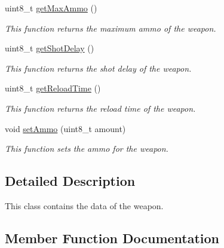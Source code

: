 \begin{DoxyCompactItemize}
\mbox{\label{class_weapon_a32fb116e169af265f52b4f51e955f44f}} 
uint8\+\_\+t \mbox{\hyperlink{class_weapon_a32fb116e169af265f52b4f51e955f44f}{get\+Max\+Ammo}} ()
\begin{DoxyCompactList}\small\item\em This function returns the maximum ammo of the weapon. \end{DoxyCompactList}\item 
\mbox{\label{class_weapon_aee03c3f7faeb4ac9e29dd72a1821d7fe}} 
uint8\+\_\+t \mbox{\hyperlink{class_weapon_aee03c3f7faeb4ac9e29dd72a1821d7fe}{get\+Shot\+Delay}} ()
\begin{DoxyCompactList}\small\item\em This function returns the shot delay of the weapon. \end{DoxyCompactList}\item 
\mbox{\label{class_weapon_a25ab6dd12d10b3b64a78b775c3905b7a}} 
uint8\+\_\+t \mbox{\hyperlink{class_weapon_a25ab6dd12d10b3b64a78b775c3905b7a}{get\+Reload\+Time}} ()
\begin{DoxyCompactList}\small\item\em This function returns the reload time of the weapon. \end{DoxyCompactList}\item 
\mbox{\label{class_weapon_a65871b565297b49dfdb5dcc00555a0b3}} 
void \mbox{\hyperlink{class_weapon_a65871b565297b49dfdb5dcc00555a0b3}{set\+Ammo}} (uint8\+\_\+t amount)
\begin{DoxyCompactList}\small\item\em This function sets the ammo for the weapon. \end{DoxyCompactList}\end{DoxyCompactItemize}


\subsection{Detailed Description}
This class contains the data of the weapon. 

\subsection{Member Function Documentation}
\mbox{\label{class_weapon_a6d42418876685100d754e566c627aea7}} 
